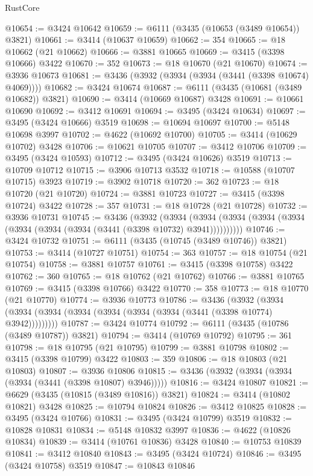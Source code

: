 \begin{lexlean}{RustCore}
\begin{coremodule}
@10654 := @3424 @10642
@10659 := @6111 (@3435 (@10653 (@3489 @10654)) @3821)
@10661 := @3414 (@10637 @10659)
@10662 := 354
@10665 := @18 @10662 (@21 @10662)
@10666 := @3881 @10665
@10669 := @3415 (@3398 @10666) @3422
@10670 := 352
@10673 := @18 @10670 (@21 @10670)
@10674 := @3936 @10673
@10681 := @3436 (@3932 (@3934 (@3934 (@3441 (@3398 @10674) @4069))))
@10682 := @3424 @10674
@10687 := @6111 (@3435 (@10681 (@3489 @10682)) @3821)
@10690 := @3414 (@10669 @10687) @3428
@10691 := @10661 @10690
@10692 := @3412 @10691
@10694 := @3495 (@3424 @10634)
@10697 := @3495 (@3424 @10666) @3519
@10698 := @10694 @10697
@10700 := @5148 @10698 @3997
@10702 := @4622 (@10692 @10700)
@10705 := @3414 (@10629 @10702) @3428
@10706 := @10621 @10705
@10707 := @3412 @10706
@10709 := @3495 (@3424 @10593)
@10712 := @3495 (@3424 @10626) @3519
@10713 := @10709 @10712
@10715 := @3906 @10713 @3532
@10718 := @10588 (@10707 @10715) @3923
@10719 := @3902 @10718
@10720 := 362
@10723 := @18 @10720 (@21 @10720)
@10724 := @3881 @10723
@10727 := @3415 (@3398 @10724) @3422
@10728 := 357
@10731 := @18 @10728 (@21 @10728)
@10732 := @3936 @10731
@10745 := @3436
    (@3932
      (@3934 (@3934 (@3934 (@3934 (@3934 (@3934 (@3934 (@3934 (@3441 (@3398 @10732) @3941))))))))))
@10746 := @3424 @10732
@10751 := @6111 (@3435 (@10745 (@3489 @10746)) @3821)
@10753 := @3414 (@10727 @10751)
@10754 := 363
@10757 := @18 @10754 (@21 @10754)
@10758 := @3881 @10757
@10761 := @3415 (@3398 @10758) @3422
@10762 := 360
@10765 := @18 @10762 (@21 @10762)
@10766 := @3881 @10765
@10769 := @3415 (@3398 @10766) @3422
@10770 := 358
@10773 := @18 @10770 (@21 @10770)
@10774 := @3936 @10773
@10786 := @3436
    (@3932 (@3934 (@3934 (@3934 (@3934 (@3934 (@3934 (@3934 (@3441 (@3398 @10774) @3942)))))))))
@10787 := @3424 @10774
@10792 := @6111 (@3435 (@10786 (@3489 @10787)) @3821)
@10794 := @3414 (@10769 @10792)
@10795 := 361
@10798 := @18 @10795 (@21 @10795)
@10799 := @3881 @10798
@10802 := @3415 (@3398 @10799) @3422
@10803 := 359
@10806 := @18 @10803 (@21 @10803)
@10807 := @3936 @10806
@10815 := @3436 (@3932 (@3934 (@3934 (@3934 (@3441 (@3398 @10807) @3946)))))
@10816 := @3424 @10807
@10821 := @6629 (@3435 (@10815 (@3489 @10816)) @3821)
@10824 := @3414 (@10802 @10821) @3428
@10825 := @10794 @10824
@10826 := @3412 @10825
@10828 := @3495 (@3424 @10766)
@10831 := @3495 (@3424 @10799) @3519
@10832 := @10828 @10831
@10834 := @5148 @10832 @3997
@10836 := @4622 (@10826 @10834)
@10839 := @3414 (@10761 @10836) @3428
@10840 := @10753 @10839
@10841 := @3412 @10840
@10843 := @3495 (@3424 @10724)
@10846 := @3495 (@3424 @10758) @3519
@10847 := @10843 @10846

\end{coremodule}
\end{lexlean}
